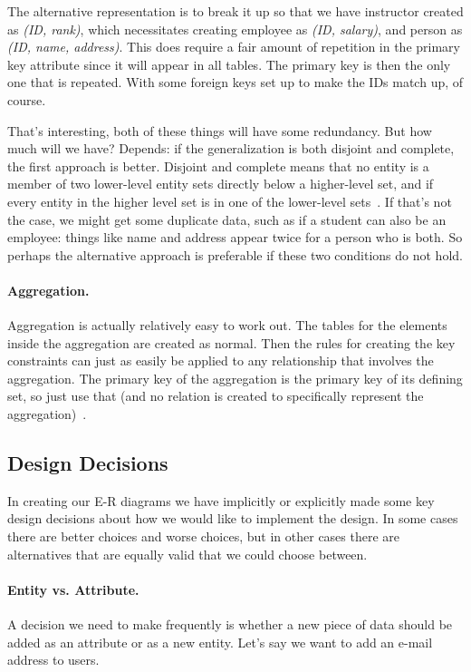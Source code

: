 The alternative representation is to break it up so that we have instructor created as \textit{(ID, rank)}, which necessitates creating employee as \textit{(ID, salary)}, and person as \textit{(ID, name, address)}. This does require a fair amount of repetition in the primary key attribute since it will appear in all tables. The primary key is then the only one that is repeated. With some foreign keys set up to make the IDs match up, of course.

That's interesting, both of these things will have some redundancy. But how much will we have? Depends: if the generalization is both disjoint and complete, the first approach is better. Disjoint and complete means that no entity is a member of two lower-level entity sets directly below a higher-level set, and if every entity in the higher level set is in one of the lower-level sets~\cite{dsc}. If that's not the case, we might get some duplicate data, such as if a student can also be an employee: things like name and address appear twice for a person who is both. So perhaps the alternative approach is preferable if these two conditions do not hold.

\paragraph{Aggregation.} Aggregation is actually relatively easy to work out. The tables for the elements inside the aggregation are created as normal. Then the rules for creating the key constraints can just as easily be applied to any relationship that involves the aggregation. The primary key of the aggregation is the primary key of its defining set, so just use that (and no relation is created to specifically represent the aggregation)~\cite{dsc}.

\subsection*{Design Decisions}

In creating our E-R diagrams we have implicitly or explicitly made some key design decisions about how we would like to implement the design. In some cases there are better choices and worse choices, but in other cases there are alternatives that are equally valid that we could choose between.

\paragraph{Entity vs. Attribute.} A decision we need to make frequently is whether a new piece of data should be added as an attribute or as a new entity. Let's say we want to add an e-mail address to users.

